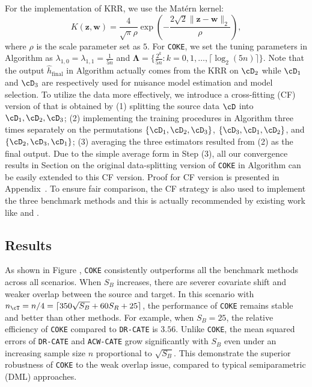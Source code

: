 \documentclass[12pt,a4paper,pdftex,onepage]{article}
\newcommand{\final}{\operatorname{final}}
\begin{document}
For the implementation of KRR, we use the Matérn kernel:
\[
K(\boldsymbol z,\boldsymbol w) = \frac{4}{\sqrt{\pi} \rho} \exp\left(-\frac{2\sqrt{2} \|\boldsymbol{z} - \boldsymbol{w}\|_2}{\rho}\right),
\]
where $\rho$ is the scale parameter set as $5$. For \texttt{COKE}, we set the tuning parameters in Algorithm  as $\lambda_{1,0}=\lambda_{1,1} = \frac{1}{5n}$ and ${\bm \Lambda} = \{\frac{2^k}{5n} : k = 0, 1, \ldots, \lceil\log_2(5n)\rceil\}$. Note that the output $\hat{h}_{\final}$ in Algorithm  actually comes from the KRR on $\cD_{2}$ while $\cD_{1}$ and $\cD_{3}$ are respectively used for nuisance model estimation and model selection. To utilize the data more effectively, we introduce a cross-fitting (CF) version of that is obtained by (1) splitting the source data $\cD$ into $\cD_{1},\cD_{2},\cD_{3}$; (2) implementing the training procedures in Algorithm  three times separately on the permutations $\{\cD_{1},\cD_{2},\cD_{3}\}$, $\{\cD_{3},\cD_{1},\cD_{2}\}$, and $\{\cD_{2},\cD_{3},\cD_{1}\}$; (3) averaging the three estimators resulted from (2) as the final output. 
Due to the simple average form in Step (3), all our convergence results in Section  on the original data-splitting version of \texttt{COKE} in Algorithm  can be easily extended to this CF version. 
Proof for CF version is presented in Appendix~.
To ensure fair comparison, the CF strategy is also used to implement the three benchmark methods and this is actually recommended by existing work like \cite{chernozhukov2018double} and \cite{kennedy2020towards}.



\subsection{Results}



As shown in Figure , \texttt{COKE} consistently outperforms all the benchmark methods across all scenarios. When $S_B$ increases, there are severer covariate shift and weaker overlap between the source and target. In this scenario with $n_{\cT}=n/4=\lceil 350\sqrt{S_B}+60S_R+25 \rceil$, the performance of \texttt{COKE} remains stable and better than other methods. For example, when $S_B = 25$, the relative efficiency of \texttt{COKE} compared to \texttt{DR-CATE} is $3.56$. Unlike \texttt{COKE}, the mean squared errors of \texttt{DR-CATE} and \texttt{ACW-CATE} grow significantly with $S_B$ even under an increasing sample size $n$ proportional to $\sqrt{S_B}$. This demonstrate the superior robustness of \texttt{COKE} to the weak overlap issue, compared to typical semiparametric (DML) approaches. 
\end{document}
